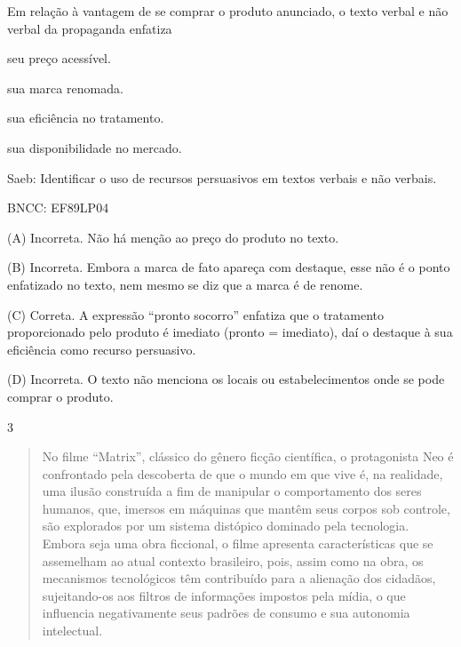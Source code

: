 Em relação à vantagem de se comprar o produto anunciado, o texto verbal
e não verbal da propaganda enfatiza

\begin{escolha}
\item seu preço acessível.

\item sua marca renomada.

\item sua eficiência no tratamento.

\item sua disponibilidade no mercado.
\end{escolha}

Saeb: Identificar o uso de recursos persuasivos em textos verbais e não
verbais.

BNCC: EF89LP04

(A) Incorreta. Não há menção ao preço do produto no texto.

(B) Incorreta. Embora a marca de fato apareça com destaque, esse não é o
ponto enfatizado no texto, nem mesmo se diz que a marca é de renome.

(C) Correta. A expressão ``pronto socorro'' enfatiza que o tratamento
proporcionado pelo produto é imediato (pronto = imediato), daí o
destaque à sua eficiência como recurso persuasivo.

(D) Incorreta. O texto não menciona os locais ou estabelecimentos onde
se pode comprar o produto.

\num{3}

\begin{quote}
No filme ``Matrix'', clássico do gênero ficção científica, o
protagonista Neo é confrontado pela descoberta de que o mundo em que
vive é, na realidade, uma ilusão construída a fim de manipular o
comportamento dos seres humanos, que, imersos em máquinas que mantêm
seus corpos sob controle, são explorados por um sistema distópico
dominado pela tecnologia. Embora seja uma obra ficcional, o filme
apresenta características que se assemelham ao atual contexto
brasileiro, pois, assim como na obra, os mecanismos tecnológicos têm
contribuído para a alienação dos cidadãos, sujeitando-os aos filtros de
informações impostos pela mídia, o que influencia negativamente seus
padrões de consumo e sua autonomia intelectual.
\end{quote}


